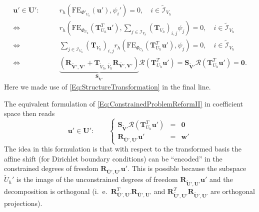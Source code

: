 \begin{equation}\label{Eq:TransformedConstrainedProblem2}
\begin{split}
\mathbf{u}'\in\mathbf{U}' : \qquad 
& r_h\left(\text{FE}_{\Phi'_{U_h}}(\mathbf{u}'),\psi_i'\right) = 0, \quad
i\in\tilde{\mathcal{I}}_{V_h}\\
\Leftrightarrow \  &
r_h\left(\text{FE}_{\Phi_{U_h}}(\mathbf{T}^T_{U_h}\mathbf{u}'),
\sum_{j\in\mathcal{I}_{V_h}}\left(\mathbf{T}_{V_h}\right)_{i,j}\psi_j\right) = 0, \quad
i\in\tilde{\mathcal{I}}_{V_h}\\
\Leftrightarrow \  &
\sum_{j\in\mathcal{I}_{V_h}} \left(\mathbf{T}_{V_h}\right)_{i,j} 
r_h\left(\text{FE}_{\Phi_{U_h}}(\mathbf{T}^T_{U_h}\mathbf{u}'),
\psi_j\right) = 0, \quad
i\in\tilde{\mathcal{I}}_{V_h}\\
\Leftrightarrow \  &
\underbrace{\left(\mathbf{R}_{\tilde{\mathbf{V}}',\mathbf{V}'} +
\mathbf{T}_{\tilde{V}_h,\bar{V}_h}\mathbf{R}_{\bar{\mathbf{V}}',\mathbf{V}'}
\right)}_{\mathbf{S}_{\tilde{\mathbf{V}}'}}\mathcal{R}\left(\mathbf{T}^T_{U_h}\mathbf{u}'\right)=
\mathbf{S}_{\tilde{\mathbf{V}}'} \mathcal{R}\left(\mathbf{T}^T_{U_h}\mathbf{u}'\right)
= \mathbf{0} .
\end{split}
\end{equation}
Here we made use of \eqref{Eq:StructureTransformation} in the final line.

The equivalent formulation of
\eqref{Eq:ConstrainedProblemReformII} in coefficient space then reads
\begin{equation}\label{Eq:ConstrainedProblemInCoefficientSpace}
\mathbf{u}'\in\mathbf{U}' : \qquad \left\{\begin{array}{rcl}
\mathbf{S}_{\tilde{\mathbf{V}}'}
\mathcal{R}\left(\mathbf{T}^T_{U_h}\mathbf{u}'\right)
& = & \mathbf{0}\\
\mathbf{R}_{\bar{\mathbf{U}}',\mathbf{U}'} \mathbf{u}' & = & \mathbf{w}'
\end{array}\right. 
\end{equation}
The idea in this formulation is that with respect to the transformed
basis the affine shift (for Dirichlet boundary conditions) can be
``encoded'' in the constrained degrees of freedom
$\mathbf{R}_{\bar{\mathbf{U}}',\mathbf{U}'} \mathbf{u}'$. This is
possible because the subspace $\tilde{U}_h'$ is the image
of the unconstrained degrees of freedom
$\mathbf{R}_{\tilde{\mathbf{U}}',\mathbf{U}'} \mathbf{u}'$ 
and the decomposition is orthogonal
(i.~e.~$\mathbf{R}^T_{\bar{\mathbf{U}}',\mathbf{U}'}
\mathbf{R}_{\bar{\mathbf{U}}',\mathbf{U}'}$ and
$\mathbf{R}^T_{\tilde{\mathbf{U}}',\mathbf{U}'}
\mathbf{R}_{\tilde{\mathbf{U}}',\mathbf{U}'}$ are orthogonal
projections). 





